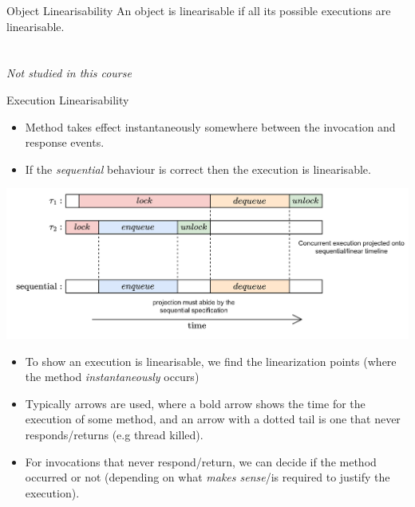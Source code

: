 \begin{tcbraster}[raster columns=2,raster equal height]
	\begin{definitionbox}{Object Linearisability}
		An object is linearisable if all its possible executions are linearisable.
		\\
		\\
		\\ \textit{Not studied in this course}
	\end{definitionbox}
	\begin{definitionbox}{Execution Linearisability}
		\begin{itemize}
			\item Method takes effect instantaneously somewhere between the invocation and response events.
			\item If the \textit{sequential} behaviour is correct then the execution is linearisable.
		\end{itemize}
	\end{definitionbox}
\end{tcbraster}
\begin{center}
	\includegraphics[width=\textwidth]{concurrent_objects/images/sequential_projection.drawio.png}
\end{center}
\begin{itemize}
	\item To show an execution is linearisable, we find the linearization points (where the method \textit{instantaneously} occurs)
	\item Typically arrows are used, where a bold arrow shows the time for the execution of some method, and an arrow with a dotted tail is one that never responds/returns (e.g thread killed).
	\item For invocations that never respond/return, we can decide if the method occurred or not (depending on what \textit{makes sense}/is required to justify the execution).
\end{itemize}

